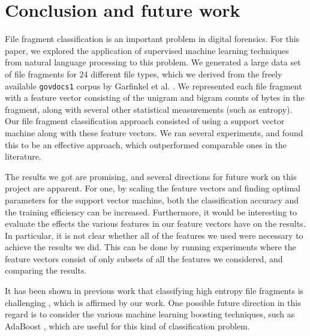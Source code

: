 \documentclass[5p]{elsarticle}
\begin{document}
\section{Conclusion and future work}
\label{Section:ConclusionAndFutureWork}
File fragment classification is an important problem in digital forensics. For this paper, we explored the application of supervised machine learning techniques from natural language processing to this problem. We generated a large data set of file fragments for 24 different file types, which we derived from the freely available \texttt{govdocs1} corpus by Garfinkel et al. \cite{Garfinkel09}. We represented each file fragment with a feature vector consisting of the unigram and bigram counts of bytes in the fragment, along with several other statistical measurements (such as entropy). Our file fragment classification approach consisted of using a support vector machine along with these feature vectors. We ran several experiments, and found this to be an effective approach, which outperformed comparable ones in the literature.

The results we got are promising, and several directions for future work on this project are apparent. For one, by scaling the feature vectors and finding optimal parameters for the support vector machine, both the classification accuracy and the training efficiency can be increased. Furthermore, it would be interesting to evaluate the effects the various features in our feature vectors have on the results. In particular, it is not clear whether all of the features we used were necessary to achieve the results we did. This can be done by running experiments where the feature vectors consist of only subsets of all the features we considered, and comparing the results.

It has been shown in previous work that classifying high entropy file fragments is challenging \cite{Conti10, Li10}, which is affirmed by our work. One possible future direction in this regard is to consider the various machine learning boosting techniques, such as AdaBoost \cite{Freund97}, which are useful for this kind of classification problem.

\end{document}
